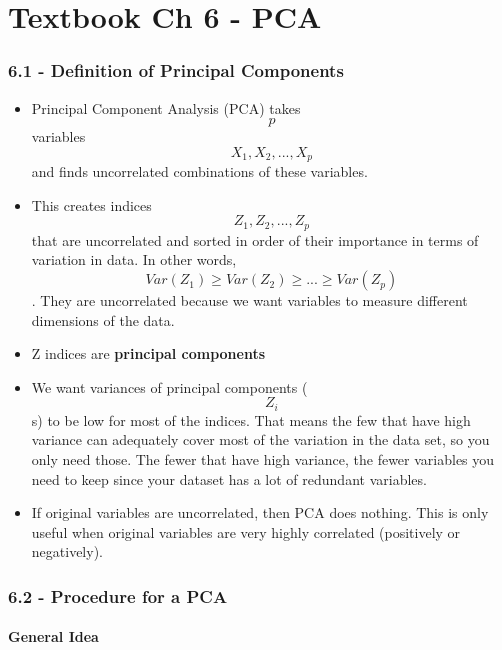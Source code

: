 \hypertarget{textbook-ch-6---pca}{%
\chapter{Textbook Ch 6 - PCA}\label{textbook-ch-6---pca}}

\hypertarget{definition-of-principal-components}{%
\subsection{6.1 - Definition of Principal
Components}\label{definition-of-principal-components}}

\begin{itemize}
\tightlist
\item
  Principal Component Analysis (PCA) takes \[p\] variables
  \[X_1, X_2, ..., X_p\]and finds uncorrelated combinations of these
  variables.
\item
  This creates indices \[Z_1, Z_2, ..., Z_p\]that are uncorrelated and
  sorted in order of their importance in terms of variation in data. In
  other words, \[Var(Z_1) \ge Var(Z_2) \ge ... \ge Var(Z_p)\]. They are
  uncorrelated because we want variables to measure different dimensions
  of the data.
\item
  Z indices are \textbf{principal components}
\item
  We want variances of principal components (\[Z_i\]s) to be low for
  most of the indices. That means the few that have high variance can
  adequately cover most of the variation in the data set, so you only
  need those. The fewer that have high variance, the fewer variables you
  need to keep since your dataset has a lot of redundant variables.
\item
  If original variables are uncorrelated, then PCA does nothing. This is
  only useful when original variables are very highly correlated
  (positively or negatively).
\end{itemize}

\hypertarget{procedure-for-a-pca}{%
\subsection{6.2 - Procedure for a PCA}\label{procedure-for-a-pca}}

\hypertarget{general-idea}{%
\subsubsection{General Idea}\label{general-idea}}

